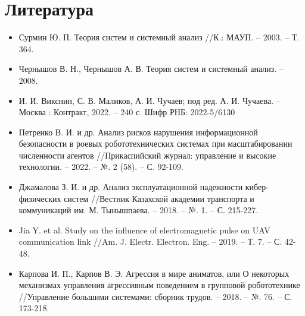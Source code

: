 \documentclass[12pt]{article}
\begin{document}
\begin{sloppypar}
    \section{Литература}
    \begin{itemize}
        \item Сурмин Ю. П. Теория систем и системный анализ //К.: МАУП. – 2003. – Т. 364.
        \item Чернышов В. Н., Чернышов А. В. Теория систем и системный анализ. – 2008.
        \item И. И. Викснин, С. В. Маликов, А. И. Чучаев; под ред. А. И. Чучаева. – Москва : Контракт, 2022. – 240 с. Шифр РНБ: 2022-5/6130
        \item Петренко В. И. и др. Анализ рисков нарушения информационной безопасности в роевых робототехнических системах при масштабировании численности агентов //Прикаспийский журнал: управление и высокие технологии. – 2022. – №. 2 (58). – С. 92-109.
        \item Джамалова З. И. и др. Анализ эксплуатационной надежности кибер-физических систем //Вестник Казахской академии транспорта и коммуникаций им. М. Тынышпаева. – 2018. – №. 1. – С. 215-227.
        \item Jia Y. et al. Study on the influence of electromagnetic pulse on UAV communication link //Am. J. Electr. Electron. Eng. – 2019. – Т. 7. – С. 42-48.
        \item Карпова И. П., Карпов В. Э. Агрессия в мире аниматов, или О некоторых механизмах управления агрессивным поведением в групповой робототехнике //Управление большими системами: сборник трудов. – 2018. – №. 76. – С. 173-218.
    \end{itemize}
\end{sloppypar}
\end{document}
